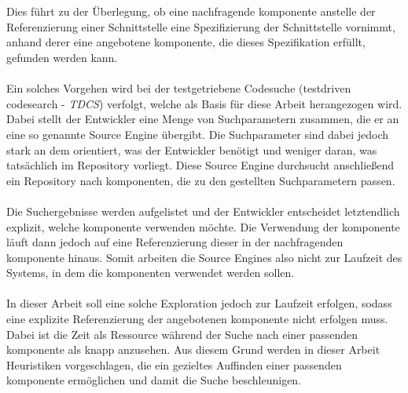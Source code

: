 \\\\
Dies führt zu der Überlegung, ob eine nachfragende \gls{komponente} anstelle der Referenzierung einer Schnittstelle eine Spezifizierung der Schnittstelle vornimmt, anhand derer eine angebotene \gls{komponente}, die dieses Spezifikation erfüllt, gefunden werden kann.
\\\\
Ein solches Vorgehen wird bei der testgetriebene Codesuche (testdriven codesearch - \emph{TDCS}) verfolgt, welche als Basis für diese Arbeit herangezogen wird. Dabei stellt der Entwickler eine Menge von Suchparametern zusammen, die er an eine so genannte Source \Gls{Engine} übergibt. Die Suchparameter sind dabei jedoch stark an dem orientiert, was der Entwickler benötigt und weniger daran, was tatsächlich im Repository vorliegt. Diese Source \Gls{Engine} durchsucht anschließend ein Repository nach \gls{komponente}n, die zu den gestellten Suchparametern passen. 
\\\\
Die Suchergebnisse werden aufgelistet und der Entwickler entscheidet letztendlich explizit, welche \gls{komponente} verwenden möchte. Die Verwendung der \gls{komponente} läuft dann jedoch auf eine Referenzierung dieser in der nachfragenden \gls{komponente} hinaus. Somit arbeiten die Source \Gls{Engine}s also nicht zur Laufzeit des Systems, in dem die \gls{komponente}n verwendet werden sollen.
\\\\
In dieser Arbeit soll eine solche Exploration jedoch zur Laufzeit erfolgen, sodass eine explizite Referenzierung der angebotenen \gls{komponente} nicht erfolgen muss. Dabei ist die Zeit als Ressource während der Suche nach einer passenden \gls{komponente} als knapp anzusehen. Aus diesem Grund werden in dieser Arbeit Heuristiken vorgeschlagen, die ein gezieltes Auffinden einer passenden \gls{komponente} ermöglichen und damit die Suche beschleunigen.

